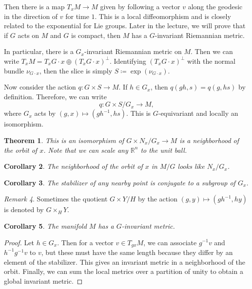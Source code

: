 \documentclass[leqno, openany]{memoir}
\newtheorem{thm}{Theorem}[section]
\newtheorem{cor}[thm]{Corollary}
\theoremstyle{definition}
\theoremstyle{remark}
\newtheorem{rmk}[thm]{Remark}
\theoremstyle{plain}
\theoremstyle{definition}
\theoremstyle{remark}
\newcommand{\R}{\mathbb{R}}
\begin{document}
Then there is a map $T_x M \to M$ given by following a vector $v$ along the geodesic in the direction of $v$ for time $1$. This is a local diffeomorphism and is closely related to the exponential for Lie groups. Later in the lecture, we will prove that if $G$ acts on $M$ and $G$ is compact, then $M$ has a $G$-invariant Riemannian metric.

In particular, there is a $G_x$-invariant Riemannian metric on $M$. Then we can write $T_x M = T_x G \cdot x \oplus ( T_x G \cdot x )^{\perp}$. Identifying $(T_x G \cdot x)^{\perp}$ with the normal bundle $\nu_{ G \cdot x }$, then the slice is simply $S \coloneqq \exp(\nu_{G \cdot x})$.

Now consider the action $q: G \times S \to M$. If $h \in G_x$, then $q(gh,s) = q(g,hs)$ by definition. Therefore, we can write
\[ q: G \times S / G_x \to M, \]
where $G_x$ acts by $(g,x) \mapsto (gh^{-1},hs)$. This is $G$-equivariant and locally an isomorphism.

\begin{thm}
    This is an isomorphism of $G \times N_x / G_x \to M$ is a neighborhood of the orbit of $x$. Note that we can scale any $\R^n$ to the unit ball.
\end{thm}

\begin{cor}
    The neighborhood of the orbit of $x$ in $M / G$ looks like $N_x / G_x$.
\end{cor}

\begin{cor}
    The stabilizer of any nearby point is conjugate to a subgroup of $G_x$.
\end{cor}

\begin{rmk}
    Sometimes the quotient $G \times Y / H$ by the action $(g,y) \mapsto (gh^{-1},hy)$ is denoted by $G \times_H Y$.
\end{rmk}

\begin{cor}
    The manifold $M$ has a $G$-invariant metric.
\end{cor}

\begin{proof}
    Let $h \in G_x$. Then for a vector $v \in T_{gx}M$, we can associate $g^{-1}v$ and $h^{-1} g^{-1}v$ to $v$, but these must have the same length because they differ by an element of the stabilizer. This gives an invariant metric in a neighborhood of the orbit. Finally, we can sum the local metrics over a partition of unity to obtain a global invariant metric.
\end{proof}
\end{document}
